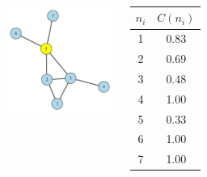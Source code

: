 \documentclass[8pt]{beamer}
\begin{document}
\begin{frame}
\frametitle{\insertsection}
\framesubtitle{\insertsubsection}

\begin{columns}
         \centering 
	\includegraphics[width=5cm]{constraint}
	
	\small
	\renewcommand{\arraystretch}{1.5}
	\begin{table}
	\begin{tabular}{cc}
		\toprule
	$n_i$ & $C(n_i)$\\
	\hline
	1 & 0.83\\
	2 & 0.69\\
	3 & 0.48\\
	4 & 1.00\\
	5 & 0.33\\
	6 & 1.00\\
	7 & 1.00\\
	\bottomrule
	\end{tabular}
	\end{table}
\end{columns}
\end{frame}

\end{document}
